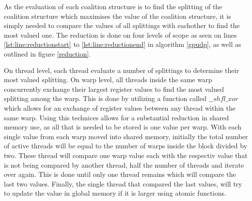 \documentclass{aamas2012}
\begin{document}
As the evaluation of each coalition structure is to find the splitting 
of the coalition structure which maximises the value of the coalition structure,
it is simply needed to compare the values of all splittings with eachother to find the most valued one. 
The reduction is done on four levels of scope as seen on lines \ref{lst:line:reductionstart} to \ref{lst:line:reductionend} in algorithm \ref{gpudp},
as well as outlined in figure \ref{reduction}. 

On thread level, each thread evaluate a number of splittings to determine their most valued splitting. 
On warp level, all threads inside the same warp concurrently exchange their largest register values to find the most valued splitting among the warp.
This is done by utilizing a function called $\_\_shfl\_xor$ which allows for an exchange of register values between any thread within the same warp.
Using this technices allows for a substantial reduction in shared memory use, as all that is needed to be stored is one value per warp. 
With each single value from each warp moved into shared memory, initially the total number of active threads will be equal to the number
of warps inside the block divided by two. These thread will compare one warp value each with the respectiv value that is not being compared by
another thread, half the number of threads and iterate over again. This is done until only one thread remains which will compare the last two values.
Finally, the single thread that compared the last values, will try to update the value in global memory if it is larger using atomic functions.
\end{document}
